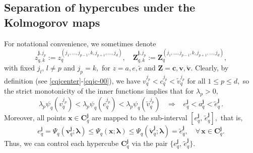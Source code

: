 \documentclass[10pt,reqno,final]{amsart}
\theoremstyle{remark}
\theoremstyle{definition}
\newcommand{\bs}[1]{\boldsymbol{#1}}
\begin{document}
\subsection{Separation of  hypercubes under the Kolmogorov maps}
For notational convenience, we sometimes denote  
\begin{equation}\label{zZjk} 
z_{q,k}^{\bs j,j_p}:=z_q^{(j_1,\ldots,j_{p-1},k, j_{p+1},\ldots, j_d)},\quad  \bs Z_{q,k}^{\bs j,j_p}:=\bs Z_q^{(j_1,\ldots,j_{p-1},k, j_{p+1},\ldots, j_d)},
\end{equation}
with fixed $j_l,\, l\not=p$ and $j_p=k,$ for 
$z=a,e,\tilde e$ and $\bs Z=\bs c, \bs v, \tilde {\bs v}.$ 
Clearly, by definition (see \eqref{cqjcenter}-\eqref{cqjc-00}), we have $v_q^{j_p}<c_q^{j_p}<\tilde v_q^{j_p}$ for all $1\le p\le d,$ so the strict monotonicity of the inner functions implies that for $\lambda_p>0,$ 
 \begin{equation}\label{lambdapsi} 
 \lambda_p \psi_q(v_q^{j_p}) <\lambda_p \psi_q(c_q^{j_p}) < 
 \lambda_p \psi_q(\tilde v_q^{j_p})\;\;\; \Rightarrow\;\;\; 
 e_q^{\bs j}< a_q^{\bs j}< \tilde e_q^{\bs j}\,.
 \end{equation}
 Moreover, all points $\bs x\in \bs C_q^{\bs j}$ are mapped to the sub-interval $[e_q^{\bs j},\, \tilde e_q^{\bs j}],$ that is,  
\begin{equation}\label{mon-hyperb}
e_q^{\bs j}=\Psi_q(\bs v_q^{\bs j};\bs \lambda)  \le \Psi_q(\bs x;\bs \lambda) \le  \Psi_q(\tilde{\bs v}_q^{\bs j};\bs \lambda)=\tilde e_q^{\bs j},\quad \forall\, \bs x\in \bs C_q^{\bs j}.
\end{equation}
Thus, we can control each hypercube $\bs C_q^{\bs j}$ via the pair $\{e_q^{\bs j},\, \tilde e_q^{\bs j}\}.$  
\end{document}
